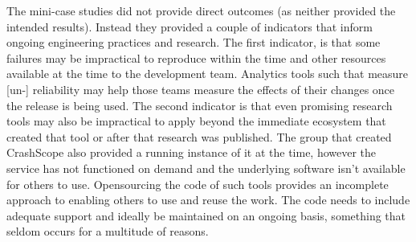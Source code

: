 The mini-case studies did not provide direct outcomes (as neither provided the intended results). Instead they provided a couple of indicators that inform ongoing engineering practices and research. The first indicator, is that some failures may be impractical to reproduce within the time and other resources available at the time to the development team. Analytics tools such that measure [un-] reliability may help those teams measure the effects of their changes once the release is being used. The second indicator is that even promising research tools may also be impractical to apply beyond the immediate ecosystem that created that tool or after that research was published. The group that created CrashScope also provided a running instance of it at the time, however the service has not functioned on demand and the underlying software isn't available for others to use. Opensourcing the code of such tools provides an incomplete approach to enabling others to use and reuse the work. The code needs to include adequate support and ideally be maintained on an ongoing basis, something that seldom occurs for a multitude of reasons.

